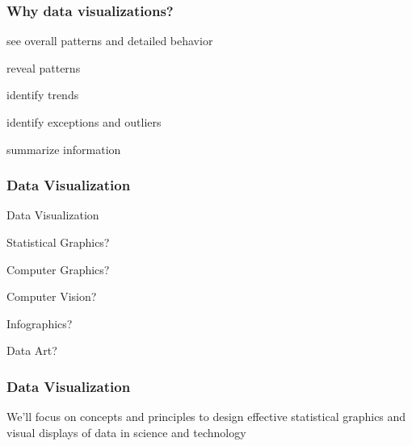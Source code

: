 \documentclass[12pt]{beamer}\usepackage[]{graphicx}\usepackage[]{color}
\begin{document}

\begin{frame}
\frametitle{Why data visualizations?}

\bbi
  \item see overall patterns and detailed behavior
  \item reveal patterns
  \item identify trends
  \item identify exceptions and outliers
  \item summarize information
\ei

\end{frame}


\begin{frame}
\frametitle{Data Visualization}

Data Visualization
\bi
  \item Statistical Graphics?
  \item Computer Graphics?
  \item Computer Vision?
  \item Infographics?
  \item Data Art?
\ei

\end{frame}


\begin{frame}
\frametitle{Data Visualization}

{\Large We'll focus on concepts and principles to design effective 
statistical graphics and visual displays of data in 
science and technology}

\end{frame}

\end{document}
